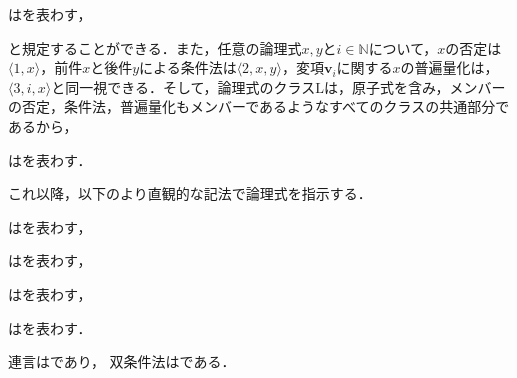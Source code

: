 \begin{df}
\label{df:原子式のクラス}
はを表わす，
\end{df}

\noindent と規定することができる．また，任意の論理式$x,y$と$i\in \mathbb{N}$について，$x$の否定は$\langle 1,x \rangle$，前件$x$と後件$y$による条件法は$ \langle 2,x,y \rangle $，変項$ \boldsymbol{v}_i $に関する$x$の普遍量化は，$\langle 3,i,x \rangle$と同一視できる．そして，論理式のクラス$\mathrm{L}$は，原子式を含み，メンバーの否定，条件法，普遍量化もメンバーであるようなすべてのクラスの共通部分であるから，

\begin{df}
\label{df:論理式のクラス}
はを表わす．
\end{df}

これ以降，以下のより直観的な記法で論理式を指示する．

\begin{df}[原子式]
\label{df:原子式}
はを表わす，
\end{df}

\begin{df}[否定]
\label{df:否定}
はを表わす，
\end{df}

\begin{df}[条件法]
\label{df:条件法}
はを表わす，
\end{df}

\begin{df}[普遍量化]
\label{df:普遍量化}
はを表わす．
\end{df}

\noindent 連言はであり，
双条件法はである．

